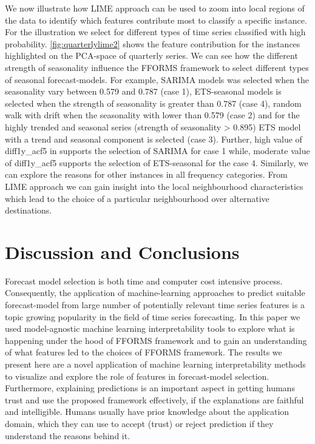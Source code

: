 \documentclass[11pt,a4paper,]{article}
\begin{document}
We now illustrate how LIME approach can be used to zoom into local
regions of the data to identify which features contribute most to
classify a specific instance. For the illustration we select for
different types of time series classified with high probability.
\autoref{fig:quarterlylime2} shows the feature contribution for the
instances highlighted on the PCA-space of quarterly series. We can see
how the different strength of seasonality influence the FFORMS framework
to select different types of seasonal forecast-models. For example,
SARIMA models was selected when the seasonality vary between 0.579 and
0.787 (case 1), ETS-seasonal models is selected when the strength of
seasonality is greater than 0.787 (case 4), random walk with drift when
the seasonality with lower than 0.579 (case 2) and for the highly
trended and seasonal series (strength of seasonality \textgreater{}
0.895) ETS model with a trend and seasonal component is selected (case
3). Further, high value of diff1y\_acf5 in supports the selection of
SARIMA for case 1 while, moderate value of diff1y\_acf5 supports the
selection of ETS-seasonal for the case 4. Similarly, we can explore the
reasons for other instances in all frequency categories. From LIME
approach we can gain insight into the local neighbourhood
characteristics which lead to the choice of a particular neighbourhood
over alternative destinations.

\section{Discussion and Conclusions}\label{conclusions}

Forecast model selection is both time and computer cost intensive
process. Consequently, the application of machine-learning approaches to
predict suitable forecast-model from large number of potentially
relevant time series features is a topic growing popularity in the field
of time series forecasting. In this paper we used model-agnostic machine
learning interpretability tools to explore what is happening under the
hood of FFORMS framework and to gain an understanding of what features
led to the choices of FFORMS framework. The results we present here are
a novel application of machine learning interpretability methods to
visualize and explore the role of features in forecast-model selection.
Furthermore, explaining predictions is an important aspect in getting
humans trust and use the proposed framework effectively, if the
explanations are faithful and intelligible. Humans usually have prior
knowledge about the application domain, which they can use to accept
(trust) or reject prediction if they understand the reasons behind it.
\end{document}
